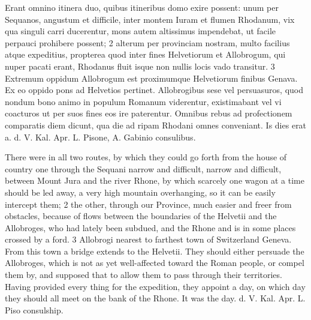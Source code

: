 \documentclass{article}
\begin{document}
\begin{multicols}{2}
Erant omnino itinera duo, quibus itineribus domo exire possent: unum per Sequanos, angustum et difficile, inter montem Iuram et flumen Rhodanum, vix qua singuli carri ducerentur, mons autem altissimus impendebat, ut facile perpauci prohibere possent; 2 alterum per provinciam nostram, multo facilius atque expeditius, propterea quod inter fines Helvetiorum et Allobrogum, qui nuper pacati erant, Rhodanus fluit isque non nullis locis vado transitur. 3 Extremum oppidum Allobrogum est proximumque Helvetiorum finibus Genava. Ex eo oppido pons ad Helvetios pertinet. Allobrogibus sese vel persuasuros, quod nondum bono animo in populum Romanum viderentur, existimabant vel vi coacturos ut per suos fines eos ire paterentur. Omnibus rebus ad profectionem comparatis diem dicunt, qua die ad ripam Rhodani omnes conveniant. Is dies erat a. d. V. Kal. Apr. L. Pisone, A. Gabinio consulibus.

\vfill\null
\columnbreak
There were in all two routes, by which they could go forth from the house of country one through the Sequani narrow and difficult, narrow and difficult, between Mount Jura and the river Rhone, by which scarcely one wagon at a time should be led away, a very high mountain overhanging, so it can be easily intercept them; 2 the other, through our Province, much easier and freer from obstacles, because of flows between the boundaries of the Helvetii and the Allobroges, who had lately been subdued, and the Rhone and is in some places crossed by a ford. 3 Allobrogi nearest to farthest town of Switzerland Geneva. From this town a bridge extends to the Helvetii. They should either persuade the Allobroges, which is not as yet well-affected toward the Roman people, or compel them by, and supposed that to allow them to pass through their territories. Having provided every thing for the expedition, they appoint a day, on which day they should all meet on the bank of the Rhone. It was the day. d. V. Kal. Apr. L. Piso consulship.
\end{multicols}
\end{document}

